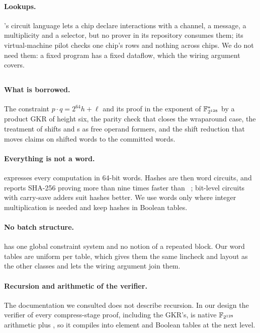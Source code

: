 \paragraph{Lookups.} \Flock{}'s circuit language lets a chip declare interactions with a channel, a message, a multiplicity and a selector, but no prover in its repository consumes them; its virtual-machine pilot checks one chip's rows and nothing across chips. We do not need them: a fixed program has a fixed dataflow, which the wiring argument covers.

\subsection{\Binius{}}

\paragraph{What is borrowed.} The \MUL{} constraint $p\cdot q = 2^{64}h + \ell$ and its proof in the exponent of $\mathbb{F}_{2^{128}}^{*}$ by a product GKR of height six, the parity check that closes the wraparound case, the treatment of shifts and \XOR{}s as free operand formers, and the shift reduction that moves claims on shifted words to the committed words.

\paragraph{Everything is not a word.} \Binius{} expresses every computation in 64-bit words. Hashes are then word circuits, and \Flock{} reports SHA-256 proving more than nine times faster than \Binius{}~\citep{flock}; bit-level circuits with carry-save adders suit hashes better. We use words only where integer multiplication is needed and keep hashes in Boolean tables.

\paragraph{No batch structure.} \Binius{} has one global constraint system and no notion of a repeated block. Our word tables are uniform per table, which gives them the same lincheck and layout as the other classes and lets the wiring argument join them.

\paragraph{Recursion and arithmetic of the verifier.} The \Binius{} documentation we consulted does not describe recursion. In our design the verifier of every compress-stage proof, including the \MUL{} GKR's, is native $\mathbb{F}_{2^{128}}$ arithmetic plus \Blake{}, so it compiles into element and Boolean tables at the next level.

